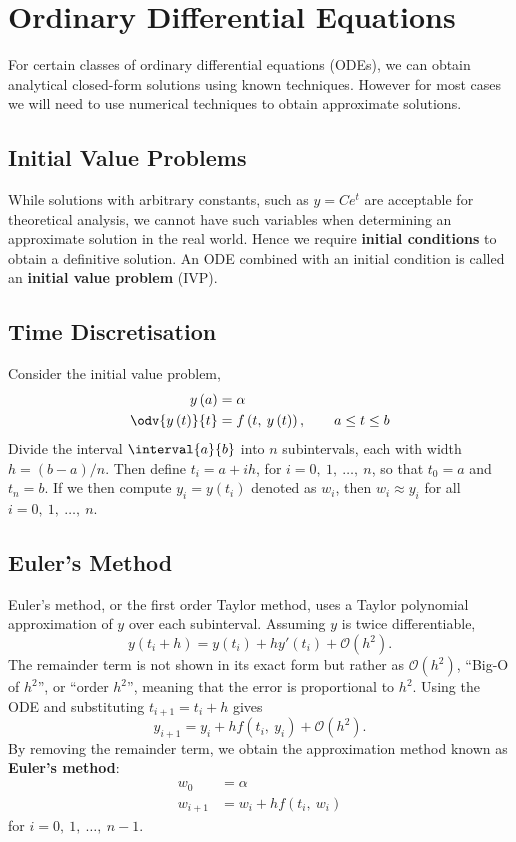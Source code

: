 \documentclass{article}
\begin{document}
\section{Ordinary Differential Equations}
For certain classes of ordinary differential equations (ODEs), we can obtain analytical closed-form solutions using known techniques.
However for most cases we will need to use numerical techniques to obtain approximate solutions.
\subsection{Initial Value Problems}
While solutions with arbitrary constants, such as \(y = C e^{t}\) are acceptable for theoretical analysis,
we cannot have such variables when determining an approximate solution in the real world.
Hence we require \textbf{initial conditions} to obtain a definitive solution. An ODE combined
with an initial condition is called an \textbf{initial value problem} (IVP).
\subsection{Time Discretisation}
Consider the initial value problem,
\begin{align*}
    y\left( a \right)          & = \alpha                                                              \\
    \odv{y\left( t \right)}{t} & = f\left( t,\: y\left( t \right) \right), \quad \quad a \leq t \leq b
\end{align*}
Divide the interval \(\interval{a}{b}\) into \(n\) subintervals, each with width \(h = \left( b - a \right) / n\).
Then define \(t_i = a + i h\), for \(i = 0,\: 1,\: \ldots,\: n\), so that \(t_0 = a\) and \(t_n = b\). If we then compute
\(y_i = y\left( t_i \right)\) denoted as \(w_i\), then \(w_i \approx y_i\) for all \(i = 0,\: 1,\: \ldots,\: n\).
\subsection{Euler's Method}
Euler's method, or the first order Taylor method, uses a Taylor polynomial approximation of \(y\) over each subinterval.
Assuming \(y\) is twice differentiable,
\begin{equation*}
    y\left( t_i + h \right) = y\left( t_i \right) + h y'\left( t_i \right) + \mathcal{O}\left( h^2 \right).
\end{equation*}
The remainder term is not shown in its exact form but rather as \(\mathcal{O}\left( h^2 \right)\), ``Big-O of \(h^2\)'', or ``order \(h^2\)'', meaning that
the error is proportional to \(h^2\). Using the ODE and substituting \(t_{i + 1} = t_i + h\) gives
\begin{equation*}
    y_{i + 1} = y_i + h f\left( t_i,\: y_i \right) + \mathcal{O}\left( h^2 \right).
\end{equation*}
By removing the remainder term, we obtain the approximation method known as \textbf{Euler's method}:
\begin{align*}
    w_0       & = \alpha                             \\
    w_{i + 1} & = w_i + h f\left( t_i,\: w_i \right)
\end{align*}
for \(i = 0,\: 1,\: \ldots,\: n - 1\).
\end{document}
